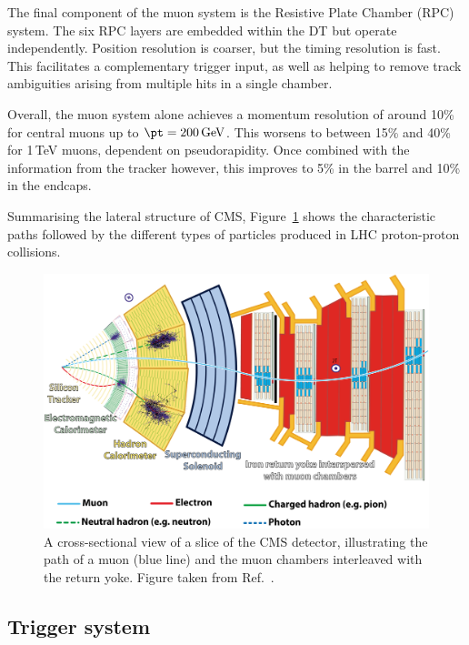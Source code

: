 The final component of the muon system is the Resistive Plate Chamber (RPC) system.
The six RPC layers are embedded within the DT but operate independently.
Position resolution is coarser, but the timing resolution is fast.
This facilitates a complementary trigger input, as well as helping to remove track ambiguities arising from multiple hits in a single chamber. %

Overall, the muon system alone achieves a momentum resolution of around 10\% for central muons up to $\pt=200\,\textrm{GeV}$.
This worsens to between 15\% and 40\% for 1\,TeV muons, dependent on pseudorapidity.
Once combined with the information from the tracker however, this improves to 5\% in the barrel and 10\% in the endcaps.

Summarising the lateral structure of CMS, 
Figure~\ref{fig:detector_CMSslice} shows the characteristic paths followed by the different types of particles produced in LHC proton-proton collisions.

\begin{figure}[h!]
  \centering
  \includegraphics[width=\textwidth]{Figures/Detector/CMSslice.png}
  \caption[A cross-sectional view of the CMS detector]
  {A cross-sectional view of a slice of the CMS detector, 
  illustrating the path of a muon (blue line) 
  and the muon chambers interleaved with the return yoke.
  Figure taken from Ref.~\cite{CMSslice}.}
  \label{fig:detector_CMSslice}
\end{figure}

\subsection{Trigger system}

